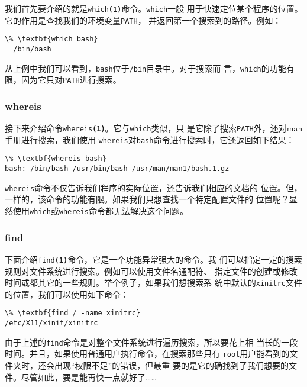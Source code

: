 我们首先要介绍的就是\texttt{which\textbf{(1)}}命令。\texttt{which}一般
用于快速定位某个程序的位置。它的作用是查找我们的环境变量\texttt{PATH}，
并返回第一个搜索到的路径。例如：
\begin{Verbatim}[frame=single, commandchars=\\\{\}]
  \% \textbf{which bash}
  /bin/bash
\end{Verbatim}
从上例中我们可以看到，\texttt{bash}位于\texttt{/bin}目录中。对于搜索而
言，\texttt{which}的功能有限，因为它只对\texttt{PATH}进行搜索。


\subsubsection{whereis}
\label{sec:systemConfig:systemOverview:findingFiles:whereis}

接下来介绍命令\texttt{whereis\textbf{(1)}}。它与\texttt{which}类似，只
是它除了搜索\texttt{PATH}外，还对man手册进行搜索，我们使用
\texttt{whereis}对\texttt{bash}命令进行搜索时，它还返回如下结果：
\begin{Verbatim}[frame=single, commandchars=\\\{\}]
\% \textbf{whereis bash}
bash: /bin/bash /usr/bin/bash /usr/man/man1/bash.1.gz
\end{Verbatim}
\texttt{whereis}命令不仅告诉我们程序的实际位置，还告诉我们相应的文档的
位置。但，一样的，该命令的功能有限。如果我们只想查找一个特定配置文件的
位置呢？显然使用\texttt{which}或\texttt{whereis}命令都无法解决这个问题。


\subsubsection{find}
\label{sec:systemConfig:systemOverview:findingFiles:find}
下面介绍\texttt{find\textbf{(1)}}命令，它是一个功能异常强大的命令。我
们可以指定一定的搜索规则对文件系统进行搜索。例如可以使用文件名通配符、
指定文件的创建或修改时间或都其它的一些规则。举个例子，如果我们想搜索系
统中默认的\texttt{xinitrc}文件的位置，我们可以使用如下命令：
\begin{Verbatim}[frame=single, commandchars=\\\{\}]
\% \textbf{find / -name xinitrc}
/etc/X11/xinit/xinitrc
\end{Verbatim}
由于上述的\texttt{find}命令是对整个文件系统进行遍历搜索，所以要花上相
当长的一段时间。并且，如果使用普通用户执行命令，在搜索那些只有
\texttt{root}用户能看到的文件夹时，还会出现``权限不足''的错误，但最重
要的是它的确找到了我们想要的文件。尽管如此，要是能再快一点就好了……


